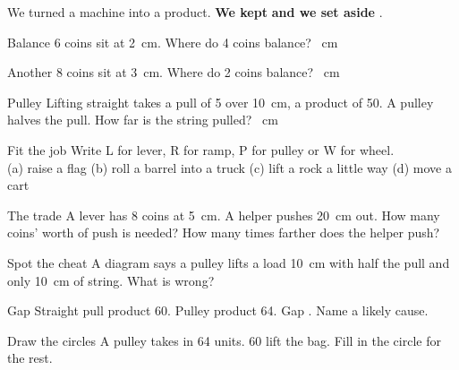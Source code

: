 \begin{keepbox}
We turned a machine into a product. \textbf{We kept} \wline[3.4cm] \textbf{and we set aside} \wline[3.4cm].
\end{keepbox}

\clearpage

\begin{puzzle}{Balance}
6 coins sit at 2~cm. Where do 4 coins balance? \wline[1.6cm]~cm
\end{puzzle}

\begin{puzzle}{Another}
8 coins sit at 3~cm. Where do 2 coins balance? \wline[1.6cm]~cm
\end{puzzle}

\begin{puzzle}{Pulley}
Lifting straight takes a pull of 5 over 10~cm, a product of 50. A pulley halves the pull. How far is the string pulled? \wline[1.6cm]~cm
\end{puzzle}

\begin{puzzle}{Fit the job}
Write L for lever, R for ramp, P for pulley or W for wheel.\\
(a) raise a flag \wline[1cm] \quad (b) roll a barrel into a truck \wline[1cm] \quad (c) lift a rock a little way \wline[1cm] \quad (d) move a cart \wline[1cm]
\end{puzzle}

\begin{puzzle}{The trade}
A lever has 8 coins at 5~cm. A helper pushes 20~cm out. How many coins' worth of push is needed? \wline[1.6cm] How many times farther does the helper push? \wline[1.6cm]
\end{puzzle}

\clearpage

\begin{puzzle}{Spot the cheat}
A diagram says a pulley lifts a load 10~cm with half the pull and only 10~cm of string. What is wrong? \wline[6cm]
\end{puzzle}

\begin{puzzle}{Gap}
Straight pull product 60. Pulley product 64. Gap \wline[1.6cm]. Name a likely cause. \wline[4cm]
\end{puzzle}

\begin{puzzle}{Draw the circles}
A pulley takes in 64 units. 60 lift the bag. Fill in the circle for the rest.
\begin{center}
\end{center}
\end{puzzle}

